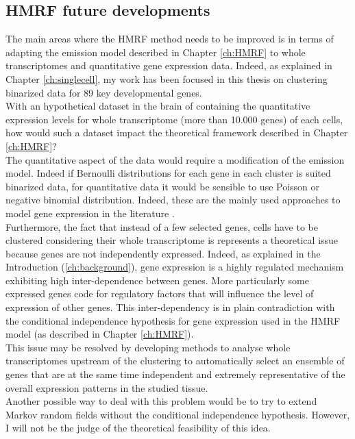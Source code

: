   \subsection{HMRF future developments}
  The main areas where the HMRF method needs to be improved is in terms of adapting the emission model described in Chapter \ref{ch:HMRF} to whole transcriptomes and quantitative gene expression data. Indeed, as explained in Chapter \ref{ch:singlecell}, my work has been focused in this thesis on clustering binarized data for 89 key developmental genes.\\
  
  With an hypothetical dataset in the brain of \platy{} containing the quantitative expression levels for whole transcriptome (more than 10.000 genes) of each cells, how would such a dataset impact the theoretical framework described in Chapter \ref{ch:HMRF}?\\
  
  The quantitative aspect of the data would require a modification of the emission model. Indeed if Bernoulli distributions for each gene in each cluster is suited binarized data, for quantitative data it would be sensible to use Poisson or negative binomial distribution. Indeed, these are the mainly used approaches to model gene expression in the literature \cite{marioni08,anders10}.\\
  
  Furthermore, the fact that instead of a few selected genes, cells have to be clustered considering their whole transcriptome is represents a theoretical issue because genes are not independently expressed. Indeed, as explained in the Introduction (\ref{ch:background}), gene expression is a highly regulated mechanism exhibiting high inter-dependence between genes. More particularly some expressed genes code for regulatory factors that will influence the level of expression of other genes. This inter-dependency is in plain contradiction with the conditional independence hypothesis for gene expression used in the HMRF model (as described in Chapter \ref{ch:HMRF}).\\
  
  This issue may be resolved by developing methods to analyse whole transcriptomes upstream of the clustering to automatically select an ensemble of genes that are at the same time independent and extremely representative of the overall expression patterns in the studied tissue.\\
  
  Another possible way to deal with this problem would be to try to extend Markov random fields without the conditional independence hypothesis. However, I will not be the judge of the theoretical feasibility of this idea.\\
  
